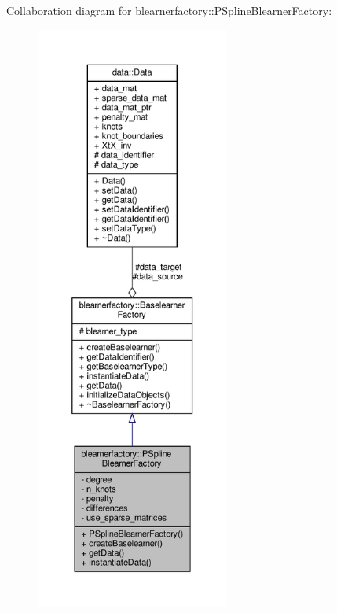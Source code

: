 Collaboration diagram for blearnerfactory\+:\+:P\+Spline\+Blearner\+Factory\+:
\nopagebreak
\begin{figure}[H]
\begin{center}
\leavevmode
\includegraphics[height=550pt]{classblearnerfactory_1_1_p_spline_blearner_factory__coll__graph}
\end{center}
\end{figure}
